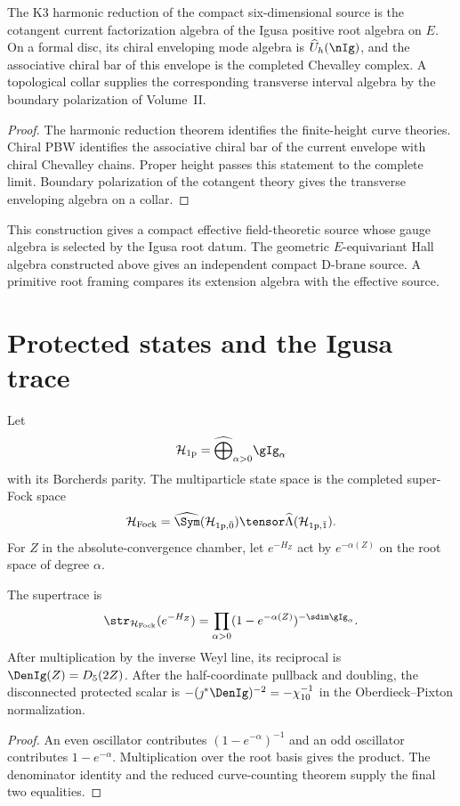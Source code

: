 \begin{corollary}
The K3 harmonic reduction of the compact six-dimensional source is the cotangent current factorization algebra of the Igusa positive root algebra on $E$.  On a formal disc, its chiral enveloping mode algebra is $\widehat U_h(\nIg)$, and the associative chiral bar of this envelope is the completed Chevalley complex.  A topological collar supplies the corresponding transverse interval algebra by the boundary polarization of Volume~II.
\end{corollary}
\begin{proof}
The harmonic reduction theorem identifies the finite-height curve theories.  Chiral PBW identifies the associative chiral bar of the current envelope with chiral Chevalley chains.  Proper height passes this statement to the complete limit.  Boundary polarization of the cotangent theory gives the transverse enveloping algebra on a collar.
\end{proof}

This construction gives a compact effective field-theoretic source whose gauge algebra is selected by the Igusa root datum.  The geometric $E$-equivariant Hall algebra constructed above gives an independent compact D-brane source.  A primitive root framing compares its extension algebra with the effective source.

\chapter{Protected states and the Igusa trace}
Let
\[
 \mathcal H_{\mathrm{1p}}
 =\widehat\bigoplus_{\alpha>0}\gIg_\alpha
\]
with its Borcherds parity.  The multiparticle state space is the completed super-Fock space
\[
 \mathcal H_{\mathrm{Fock}}=\widehat\Sym(\mathcal H_{\mathrm{1p},\bar0})
 \tensor\widehat\Lambda(\mathcal H_{\mathrm{1p},\bar1}).
\]
For $Z$ in the absolute-convergence chamber, let $e^{-H_Z}$ act by $e^{-\alpha(Z)}$ on the root space of degree $\alpha$.

\begin{theorem}
The supertrace is
\[
 \str_{\mathcal H_{\mathrm{Fock}}}(e^{-H_Z})
 =\prod_{\alpha>0}
 (1-e^{-\alpha(Z)})^{-\sdim\gIg_\alpha}.
\]
After multiplication by the inverse Weyl line, its reciprocal is $\DenIg(Z)=D_5(2Z)$.  After the half-coordinate pullback and doubling, the disconnected protected scalar is $-(\jmath^*\DenIg)^{-2}=-\chi_{10}^{-1}$ in the Oberdieck--Pixton normalization.
\end{theorem}
\begin{proof}
An even oscillator contributes $(1-e^{-\alpha})^{-1}$ and an odd oscillator contributes $1-e^{-\alpha}$.  Multiplication over the root basis gives the product.  The denominator identity and the reduced curve-counting theorem supply the final two equalities.
\end{proof}

